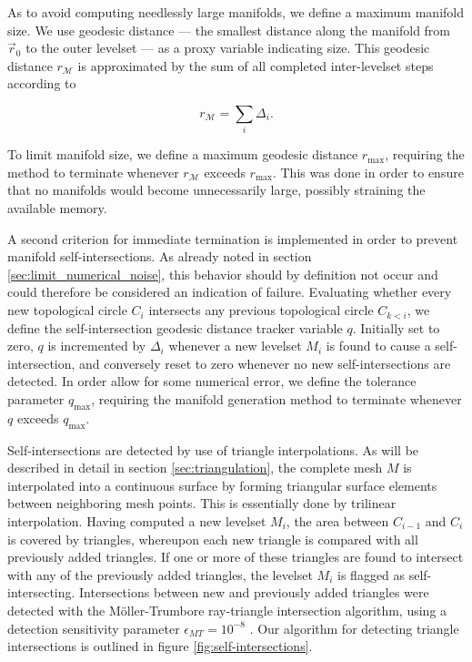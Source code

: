 As to avoid computing needlessly large manifolds, we define a maximum manifold size. We use geodesic distance --- the smallest distance along the manifold from $\vec{r}_0$ to the outer levelset --- as a proxy variable indicating size. This geodesic distance $r_{\mathcal{M}}$ is approximated by the sum of all completed inter-levelset steps according to 

\begin{equation}
r_{\mathcal{M}} = \sum_{i}\Delta_i.
\end{equation}

\noindent To limit manifold size, we define a maximum geodesic distance $r_{\text{max}}$, requiring the method to terminate whenever $r_{\mathcal{M}}$ exceeds $r_{\text{max}}$. This was done in order to ensure that no manifolds would become unnecessarily large, possibly straining the available memory.

A second criterion for immediate termination is implemented in order to prevent manifold self-intersections. As already noted in section \ref{sec:limit_numerical_noise}, this behavior should by definition not occur and could therefore be considered an indication of failure. Evaluating whether every new topological circle $C_i$ intersects any previous topological circle $C_{k<i}$, we define the self-intersection geodesic distance tracker variable $q$. Initially set to zero, $q$ is incremented by $\Delta_i$ whenever a new levelset $M_i$ is found to cause a self-intersection, and conversely reset to zero whenever no new self-intersections are detected. In order allow for some numerical error, we define the tolerance parameter $q_{\text{max}}$, requiring the manifold generation method to terminate whenever $q$ exceeds $q_{\text{max}}$.

Self-intersections are detected by use of triangle interpolations. As will be described in detail in section \ref{sec:triangulation}, the complete mesh $M$ is interpolated into a continuous surface by forming triangular surface elements between neighboring mesh points. This is essentially done by trilinear interpolation. Having computed a new levelset $M_i$, the area between $C_{i-1}$ and $C_i$ is covered by triangles, whereupon each new triangle is compared with all previously added triangles. If one or more of these triangles are found to intersect with any of the previously added triangles, the levelset $M_i$ is flagged as self-intersecting. Intersections between new and previously added triangles were detected with the Möller-Trumbore ray-triangle intersection algorithm, using a detection sensitivity parameter $\epsilon_{MT}=10^{-8}$ \citep{MollerTrumbore}. Our algorithm for detecting triangle intersections is outlined in figure \ref{fig:self-intersections}.

